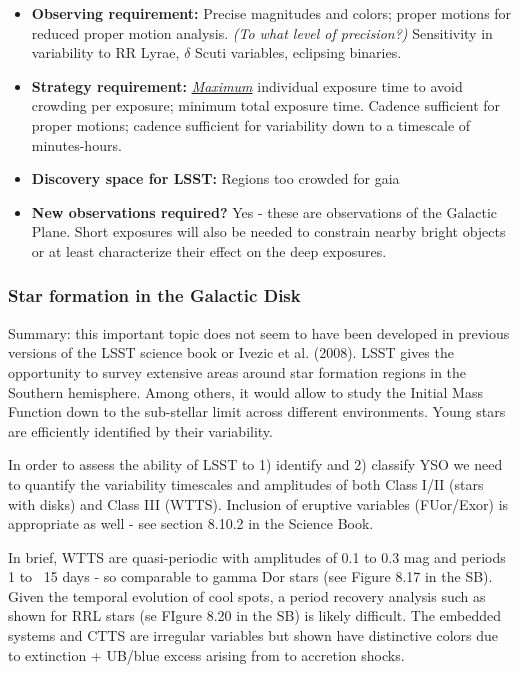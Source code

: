 \begin{itemize}
\item {\bf Observing requirement:} Precise magnitudes and colors; proper motions for reduced proper motion analysis. {\it (To what level of precision?)} Sensitivity in variability to RR Lyrae,  $\delta$ Scuti variables, eclipsing binaries.
\vspace{-2mm}

\item {\bf Strategy requirement:} \underline{\it Maximum} individual exposure time to avoid crowding per exposure; minimum total exposure time. Cadence sufficient for proper motions; cadence sufficient for variability down to a timescale of minutes-hours.
\vspace{-2mm}

\item {\bf Discovery space for LSST:} Regions too crowded for gaia
\vspace{-2mm}


\item {\bf New observations required?} Yes - these are observations of the Galactic Plane. Short exposures will also be needed to constrain nearby bright objects or at least characterize their effect on the deep exposures.
\vspace{-2mm}
\end{itemize}


\subsubsection{Star formation in the Galactic Disk}

Summary: this important topic does not seem to have been developed in
previous versions of the LSST science book or Ivezic et
al. (2008). LSST gives the opportunity to survey extensive areas
around star formation regions in the Southern hemisphere. Among
others, it would allow to study the Initial Mass Function down to the
sub-stellar limit across different environments. Young stars are
efficiently identified by their variability.

In order to assess the ability of LSST to 1) identify and 2) classify YSO we need to quantify the variability timescales and amplitudes of both Class I/II (stars with disks) and Class III (WTTS). Inclusion of eruptive variables (FUor/Exor) is appropriate as well - see section 8.10.2 in the Science Book.

In brief, WTTS are quasi-periodic with amplitudes of 0.1 to 0.3 mag and periods 1 to ~15 days - so comparable to gamma Dor stars (see Figure 8.17 in the SB). Given the temporal evolution of cool spots, a period recovery analysis such as shown for RRL stars (se FIgure 8.20 in the SB) is likely difficult. The embedded systems and CTTS are irregular variables but shown have distinctive colors due to extinction + UB/blue excess arising from to accretion shocks.


